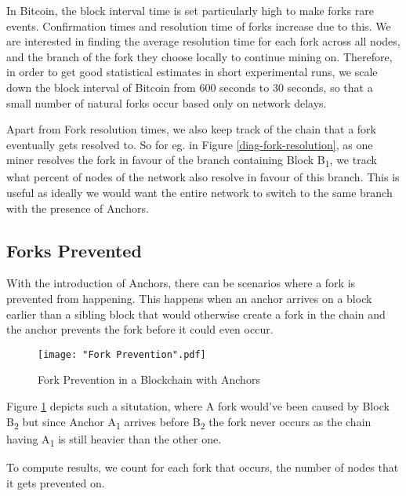 In Bitcoin, the block interval time is set particularly high to make forks rare events. Confirmation times and resolution time of forks increase due to this. 
We are interested in finding the average resolution time for each fork across all nodes, and the branch of the fork they choose locally to continue mining on. 
Therefore, in order to get good statistical estimates in short experimental runs, we scale down the block interval of Bitcoin from 600 seconds to 30 seconds, so that a small number of natural forks occur based only on network delays.

Apart from Fork resolution times, we also keep track of the chain that a fork eventually gets resolved to. 
So for eg. in Figure \ref{diag-fork-resolution}, as one miner resolves the fork in favour of the branch containing Block B\textsubscript{1}, we track what percent of nodes of the network also resolve in favour of this branch.
This is useful as ideally we would want the entire network to switch to the same branch with the presence of Anchors.


\newpage
\subsection{Forks Prevented} \label{exp-forks-prevented}

With the introduction of Anchors, there can be scenarios where a fork is prevented from happening. This happens when an anchor arrives on a block earlier than a sibling block that would otherwise create a fork in the chain and the anchor prevents the fork before it could even occur.

\begin{figure}[!htb]
    \centering
    \texttt{[image: "Fork Prevention".pdf]}
    \caption{Fork Prevention in a Blockchain with Anchors}
        
    \label{diag-fork-prevention}
\end{figure}


Figure \ref{diag-fork-prevention} depicts such a situtation, where A fork would've been caused by Block B\textsubscript{2} but since Anchor A\textsubscript{1} arrives before B\textsubscript{2} the fork never occurs as the chain having A\textsubscript{1} is still heavier than the other one.

To compute results, we count for each fork that occurs, the number of nodes that it gets prevented on.

